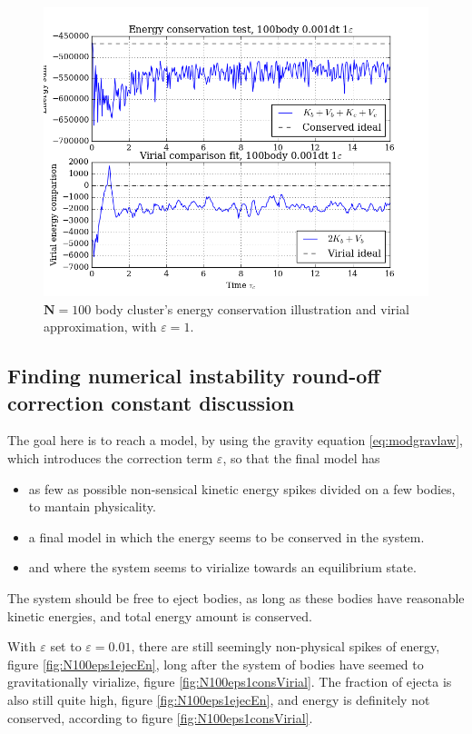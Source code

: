\documentclass[11pt,a4paper,notitlepage,twocolumn]{article}
\begin{document}
\begin{figure}
[H]\center
\includegraphics[scale=0.35]{../figs/ClusterEnConsvVirial_100body_dt1_eps100_dur16.png}
\caption{$\mathbf{N} = 100$ body cluster's energy conservation illustration and virial approximation, with $\varepsilon = 1$.}\label{fig:N100eps100consVirial}
\end{figure}

\subsection{Finding numerical instability round-off correction constant discussion}
The goal here is to reach a model, by using the gravity equation \ref{eq:modgravlaw}, which introduces the correction term $\varepsilon$, so that the final model has \begin{itemize}
\item as few as possible non-sensical kinetic energy spikes divided on a few bodies, to mantain physicality.
\item a final model in which the energy seems to be conserved in the system.
\item and where the system seems to virialize towards an equilibrium state.
\end{itemize}

The system should be free to eject bodies, as long as these bodies have reasonable kinetic energies, and total energy amount is conserved.

With $\varepsilon$ set to $\varepsilon = 0.01$, there are still seemingly non-physical spikes of energy, figure \ref{fig:N100eps1ejecEn}, long after the system of bodies have seemed to gravitationally virialize, figure \ref{fig:N100eps1consVirial}. The fraction of ejecta is also still quite high, figure \ref{fig:N100eps1ejecEn}, and energy is definitely not conserved, according to figure \ref{fig:N100eps1consVirial}.
\end{document}
